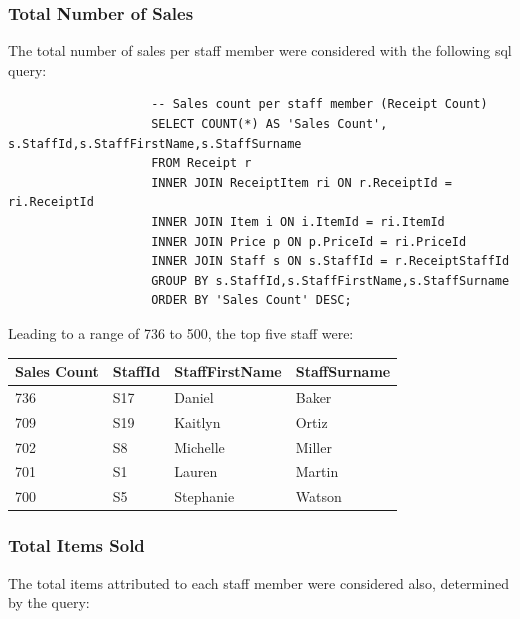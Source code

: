 \documentclass{article}
\begin{document}
            \subsubsection{Total Number of Sales}
                The total number of sales per staff member were considered with the following 
                sql query:
                \begin{lstlisting}
                    -- Sales count per staff member (Receipt Count)
                    SELECT COUNT(*) AS 'Sales Count', s.StaffId,s.StaffFirstName,s.StaffSurname
                    FROM Receipt r
                    INNER JOIN ReceiptItem ri ON r.ReceiptId = ri.ReceiptId
                    INNER JOIN Item i ON i.ItemId = ri.ItemId
                    INNER JOIN Price p ON p.PriceId = ri.PriceId
                    INNER JOIN Staff s ON s.StaffId = r.ReceiptStaffId
                    GROUP BY s.StaffId,s.StaffFirstName,s.StaffSurname
                    ORDER BY 'Sales Count' DESC;
                \end{lstlisting}

                Leading to a range of 736 to 500, the top five staff were:

                \begin{table}[H]
                    \centering
                    \begin{tabular}{|l|l|l|l|}
                    \hline
                    Sales Count & StaffId & StaffFirstName & StaffSurname \\ \hline
                    736         & S17     & Daniel         & Baker        \\ \hline
                    709         & S19     & Kaitlyn        & Ortiz        \\ \hline
                    702         & S8      & Michelle       & Miller       \\ \hline
                    701         & S1      & Lauren         & Martin       \\ \hline
                    700         & S5      & Stephanie      & Watson       \\ \hline
                    \end{tabular}
                \end{table}
            \newpage
            \subsubsection{Total Items Sold}
                The total items attributed to each staff member were considered also,
                determined by the query:
                
\end{document}
